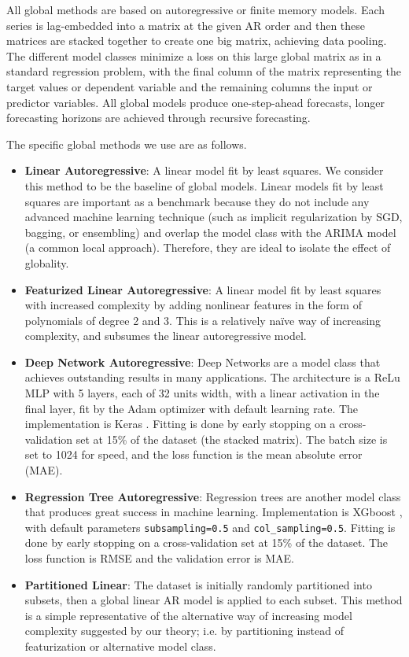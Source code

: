 \documentclass[a4paper]{article}
\theoremstyle{custom}
\begin{document}
All global methods are based on autoregressive or finite memory models. Each series is lag-embedded into a matrix at the given AR order and then these matrices are stacked together to create one big matrix, achieving data pooling. The different model classes minimize a loss on this large global matrix as in a standard regression problem, with the final column of the matrix representing the target values or dependent variable and the remaining columns the input or predictor variables. All global models produce one-step-ahead forecasts, longer forecasting horizons are achieved through recursive forecasting.

The specific global methods we use are as follows.
\begin{itemize}
\item \textbf{Linear Autoregressive}: A linear model fit by least squares. We consider this method to be the baseline of global models. Linear models fit by least squares are important as a benchmark because they do not include any advanced machine learning technique (such as implicit regularization by SGD, bagging, or ensembling) and overlap the model class with the ARIMA model (a common local approach). Therefore, they are ideal to isolate the effect of globality.
\item \textbf{Featurized Linear Autoregressive}: A linear model fit by least squares with increased complexity by adding nonlinear features in the form of polynomials of degree 2 and 3. This is a relatively naïve way of increasing complexity, and subsumes the linear autoregressive model.
\item \textbf{Deep Network Autoregressive}: Deep Networks are a model class that achieves outstanding results in many applications. The architecture is a ReLu MLP with 5 layers, each of 32 units width, with a linear activation in the final layer, fit by the Adam optimizer with default learning rate. The implementation is Keras \cite{chollet2015keras}. Fitting is done by early stopping on a cross-validation set at 15\% of the dataset (the stacked matrix). The batch size is set to 1024 for speed, and the loss function is the mean absolute error (MAE).
\item \textbf{Regression Tree Autoregressive}: Regression trees are another model class that produces great success in machine learning. Implementation is XGboost \cite{chen2016xgboost}, with default parameters \texttt{subsampling=0.5} and \texttt{col\_sampling=0.5}. Fitting is done by early stopping on a cross-validation set at 15\% of the dataset. The loss function is RMSE and the validation error is MAE.
\item \textbf{Partitioned Linear}: The dataset is initially randomly partitioned into subsets, then a global linear AR model is applied to each subset. This method is a simple representative of the alternative way of increasing model complexity suggested by our theory; i.e. by partitioning instead of featurization or alternative model class.
\end{itemize}
\end{document}
